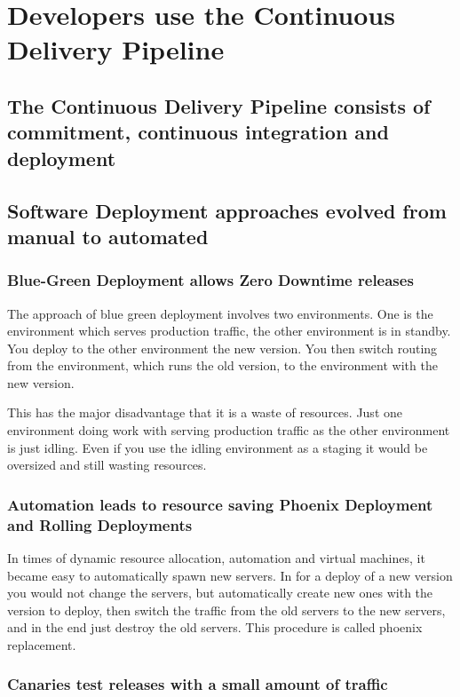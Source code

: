\chapter{Developers use the Continuous Delivery Pipeline}

\section{The Continuous Delivery Pipeline consists of commitment, continuous integration and deployment}
\section{Software Deployment approaches evolved from manual to automated}
\subsection{Blue-Green Deployment allows Zero Downtime releases}

The approach of blue green deployment involves two environments. One is the environment which serves production traffic, the other environment is in standby. You deploy to the other environment the new version. You then switch routing from the environment, which runs the old version, to the environment with the new version.

This has the major disadvantage that it is a waste of resources. Just one environment doing work with serving production traffic as the other environment is just idling. Even if you use the idling environment as a staging it would be oversized and still wasting resources.

\subsection{Automation leads to resource saving Phoenix Deployment and Rolling Deployments}

In times of dynamic resource allocation, automation and virtual machines, it became easy to automatically spawn new servers. In for a deploy of a new version you would not change the servers, but automatically create new ones with the version to deploy, then switch the traffic from the old servers to the new servers, and in the end just destroy the old servers. This procedure is called phoenix replacement.

\subsection{Canaries test releases with a small amount of traffic}


